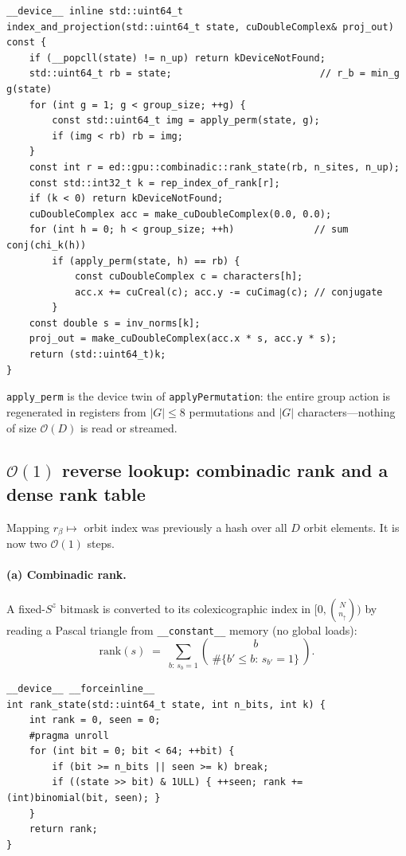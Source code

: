 \documentclass[11pt]{article}
\newcommand{\bigO}{\mathcal{O}}
\newcommand{\code}[1]{\texttt{\small #1}}
\begin{document}
\begin{lstlisting}[caption={\code{DeviceRepSymmetryBasisPolicy::index\_and\_projection}.
\code{include/ed/matvec/device\_basis\_policy.cuh}},label={lst:idxproj}]
__device__ inline std::uint64_t
index_and_projection(std::uint64_t state, cuDoubleComplex& proj_out) const {
    if (__popcll(state) != n_up) return kDeviceNotFound;
    std::uint64_t rb = state;                          // r_b = min_g g(state)
    for (int g = 1; g < group_size; ++g) {
        const std::uint64_t img = apply_perm(state, g);
        if (img < rb) rb = img;
    }
    const int r = ed::gpu::combinadic::rank_state(rb, n_sites, n_up);
    const std::int32_t k = rep_index_of_rank[r];
    if (k < 0) return kDeviceNotFound;
    cuDoubleComplex acc = make_cuDoubleComplex(0.0, 0.0);
    for (int h = 0; h < group_size; ++h)              // sum conj(chi_k(h))
        if (apply_perm(state, h) == rb) {
            const cuDoubleComplex c = characters[h];
            acc.x += cuCreal(c); acc.y -= cuCimag(c); // conjugate
        }
    const double s = inv_norms[k];
    proj_out = make_cuDoubleComplex(acc.x * s, acc.y * s);
    return (std::uint64_t)k;
}
\end{lstlisting}

\code{apply\_perm} is the device twin of \code{applyPermutation}: the entire
group action is regenerated in registers from $|G|\le 8$ permutations and $|G|$
characters---nothing of size $\bigO(D)$ is read or streamed.

\subsection{$\bigO(1)$ reverse lookup: combinadic rank and a dense rank table}

Mapping $r_\beta \mapsto$ orbit index was previously a hash over all $D$ orbit
elements. It is now two $\bigO(1)$ steps.

\paragraph{(a) Combinadic rank.} A fixed-$S^z$ bitmask is converted to its
colexicographic index in $[0,\binom{N}{n_{\uparrow}})$ by reading a Pascal
triangle from \code{\_\_constant\_\_} memory (no global loads):
\begin{equation}
  \mathrm{rank}(s) \;=\; \sum_{b:\,s_b=1}\binom{b}{\,\#\{b'\le b:\,s_{b'}=1\}\,}.
\end{equation}
\begin{lstlisting}[caption={\code{rank\_state}. \code{include/ed/gpu/combinadic.cuh}}]
__device__ __forceinline__
int rank_state(std::uint64_t state, int n_bits, int k) {
    int rank = 0, seen = 0;
    #pragma unroll
    for (int bit = 0; bit < 64; ++bit) {
        if (bit >= n_bits || seen >= k) break;
        if ((state >> bit) & 1ULL) { ++seen; rank += (int)binomial(bit, seen); }
    }
    return rank;
}
\end{lstlisting}
\end{document}

